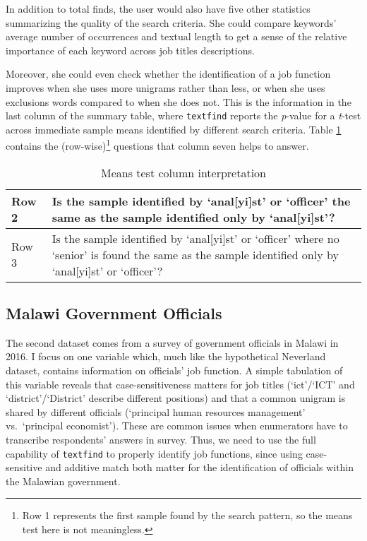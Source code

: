 In addition to total finds, the user would also have five other statistics summarizing the quality of the search criteria. She could compare keywords' average number of occurrences and textual length to get a sense of the relative importance of each keyword across job titles descriptions.

Moreover, she could even check whether the identification of a job function improves when she uses more unigrams rather than less, or when she uses exclusions words compared to when she does not. This is the information in the last column of the summary table, where {\tt textfind} reports the {\it p}-value for a {\it t}-test across immediate sample means identified by different search criteria. Table \ref{tab:1} contains the (row-wise)\footnote{Row 1 represents the first sample found by the search pattern, so the means test here is not meaningless.} questions that column seven helps to answer.

\begin{table}[!htbp]
  \caption{Means test column interpretation}\label{tab:1}
  \centering
  \small
  \begin{tabular}{|l|p{11cm}|}
  \hline
  Row 2 & Is the sample identified by `anal[yi]st' or `officer' the same as the sample identified only by `anal[yi]st'? \\
  \hline
  Row 3 & Is the sample identified by `anal[yi]st' or `officer' where no `senior' is found the same as the sample identified only by `anal[yi]st' or `officer'? \\
  \hline
  \end{tabular}
\end{table}

\subsection{Malawi Government Officials}
The second dataset comes from a survey of government officials in Malawi in 2016. I focus on one variable which, much like the hypothetical Neverland dataset, contains information on officials' job function. A simple tabulation of this variable reveals that case-sensitiveness matters for job titles (`ict'/`ICT' and `district'/`District' describe different positions) and that a common unigram is shared by different officials (`principal human resources management' vs.~`principal economist'). These are common issues when enumerators have to transcribe respondents' answers in survey. Thus, we need to use the full capability of {\tt textfind} to properly identify job functions, since using case-sensitive and additive match both matter for the identification of officials within the Malawian government.

